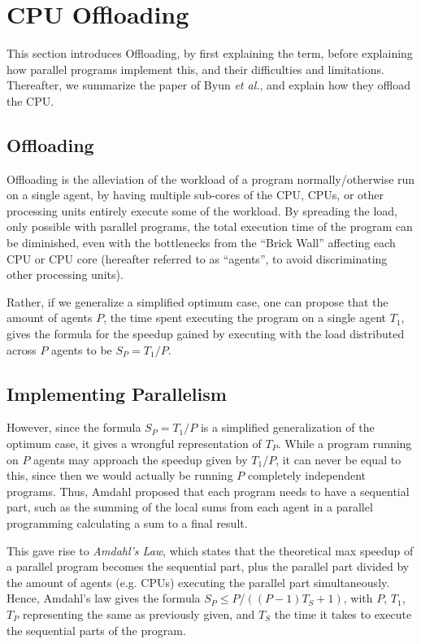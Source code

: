 
\section{CPU Offloading}
\label{sec:offloading}

This section introduces Offloading, by first explaining the term, before explaining how parallel programs implement this, and their difficulties and limitations.
Thereafter, we summarize the paper of Byun \textit{et al.}\cite{Byun:EECS-2012-215}, and explain how they offload the CPU.

\subsection{Offloading}

Offloading is the alleviation of the workload of a program normally/otherwise run on a single agent, by having multiple sub-cores of the CPU, CPUs, or other processing units entirely execute some of the workload.
By spreading the load, only possible with parallel programs, the total execution time of the program can be diminished, even with the bottlenecks from the ``Brick Wall'' affecting each CPU or CPU core (hereafter referred to as ``agents'', to avoid discriminating other processing units).

Rather, if we generalize a simplified optimum case, one can propose that the amount of agents $P$, the time spent executing the program on a single agent $T_1$, gives the formula for the speedup gained by executing with the load distributed across $P$ agents to be $S_P = T_1/P$.

\subsection{Implementing Parallelism}

However, since the formula $S_P = T_1/P$ is a simplified generalization of the optimum case, it gives a wrongful representation of $T_P$.
While a program running on $P$ agents may approach the speedup given by $T_1/P$, it can never be equal to this, since then we would actually be running $P$ completely independent programs.
Thus, Amdahl\cite{Amdahl:1967:VSP:1465482.1465560} proposed that each program needs to have a sequential part, such as the summing of the local sums from each agent in a parallel programming calculating a sum to a final result.

This gave rise to \textit{Amdahl's Law}, which states that the theoretical max speedup of a parallel program becomes the sequential part, plus the parallel part divided by the amount of agents (e.g. CPUs) executing the parallel part simultaneously.
Hence, Amdahl's law gives the formula $S_P \leq P/((P-1)T_S + 1)$, with $P$, $T_1$, $T_P$ representing the same as previously given, and $T_S$ the time it takes to execute the sequential parts of the program.

